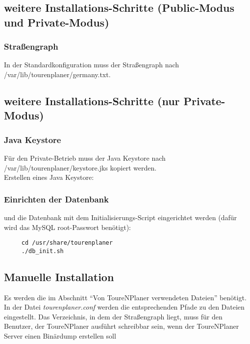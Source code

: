 \documentclass[ngerman,titlepage,parskip=true]{scrartcl}
\begin{document}
	\subsection{weitere Installations-Schritte (Public-Modus und Private-Modus)}
	\subsubsection{Stra\ss{}engraph}
	 In der Standardkonfiguration muss der Stra\ss{}engraph nach /var/lib/tourenplaner/germany.txt.
	\subsection{weitere Installations-Schritte (nur Private-Modus)}
	 \subsubsection{Java Keystore}
	 F\"ur den Private-Betrieb muss der Java Keystore nach /var/lib/tourenplaner/keystore.jks kopiert werden.\\
	 Erstellen eines Java Keystore:
	\subsubsection{Einrichten der Datenbank}
	und die Datenbank mit dem Initialisierungs-Script eingerichtet werden (daf\"ur wird das MySQL root-Passwort ben\"otigt):
   \begin{lstlisting}
	 cd /usr/share/tourenplaner
	 ./db_init.sh
	\end{lstlisting}
	
  \subsection{Manuelle Installation}
	Es werden die im Abschnitt ``Von ToureNPlaner verwendeten Dateien'' ben\"otigt.\\
	In der Datei \textit{tourenplaner.conf} werden die entsprechenden Pfade zu den Dateien eingestellt. Das Verzeichnis, in dem der Stra\ss{}engraph liegt, muss f\"ur den Benutzer, der ToureNPlaner ausf\"uhrt schreibbar sein, wenn der ToureNPlaner Server einen Bin\"ardump erstellen soll
\end{document}
